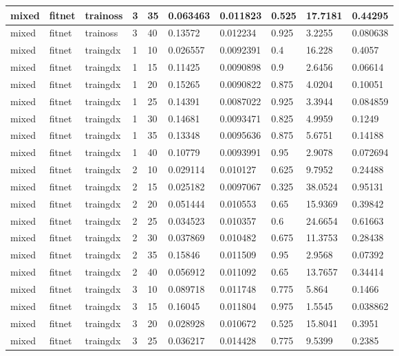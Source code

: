 \begin{longtable}{lllllllll}
mixed & fitnet & trainoss & 3 & 35 & 0.063463 & 0.011823 & 0.525 & 17.7181 & 0.44295 \\ \hline 
mixed & fitnet & trainoss & 3 & 40 & 0.13572 & 0.012234 & 0.925 & 3.2255 & 0.080638 \\ \hline 
mixed & fitnet & traingdx & 1 & 10 & 0.026557 & 0.0092391 & 0.4 & 16.228 & 0.4057 \\ \hline 
mixed & fitnet & traingdx & 1 & 15 & 0.11425 & 0.0090898 & 0.9 & 2.6456 & 0.06614 \\ \hline 
mixed & fitnet & traingdx & 1 & 20 & 0.15265 & 0.0090822 & 0.875 & 4.0204 & 0.10051 \\ \hline 
mixed & fitnet & traingdx & 1 & 25 & 0.14391 & 0.0087022 & 0.925 & 3.3944 & 0.084859 \\ \hline 
mixed & fitnet & traingdx & 1 & 30 & 0.14681 & 0.0093471 & 0.825 & 4.9959 & 0.1249 \\ \hline 
mixed & fitnet & traingdx & 1 & 35 & 0.13348 & 0.0095636 & 0.875 & 5.6751 & 0.14188 \\ \hline 
mixed & fitnet & traingdx & 1 & 40 & 0.10779 & 0.0093991 & 0.95 & 2.9078 & 0.072694 \\ \hline 
mixed & fitnet & traingdx & 2 & 10 & 0.029114 & 0.010127 & 0.625 & 9.7952 & 0.24488 \\ \hline 
mixed & fitnet & traingdx & 2 & 15 & 0.025182 & 0.0097067 & 0.325 & 38.0524 & 0.95131 \\ \hline 
mixed & fitnet & traingdx & 2 & 20 & 0.051444 & 0.010553 & 0.65 & 15.9369 & 0.39842 \\ \hline 
mixed & fitnet & traingdx & 2 & 25 & 0.034523 & 0.010357 & 0.6 & 24.6654 & 0.61663 \\ \hline 
mixed & fitnet & traingdx & 2 & 30 & 0.037869 & 0.010482 & 0.675 & 11.3753 & 0.28438 \\ \hline 
mixed & fitnet & traingdx & 2 & 35 & 0.15846 & 0.011509 & 0.95 & 2.9568 & 0.07392 \\ \hline 
mixed & fitnet & traingdx & 2 & 40 & 0.056912 & 0.011092 & 0.65 & 13.7657 & 0.34414 \\ \hline 
mixed & fitnet & traingdx & 3 & 10 & 0.089718 & 0.011748 & 0.775 & 5.864 & 0.1466 \\ \hline 
mixed & fitnet & traingdx & 3 & 15 & 0.16045 & 0.011804 & 0.975 & 1.5545 & 0.038862 \\ \hline 
mixed & fitnet & traingdx & 3 & 20 & 0.028928 & 0.010672 & 0.525 & 15.8041 & 0.3951 \\ \hline 
mixed & fitnet & traingdx & 3 & 25 & 0.036217 & 0.014428 & 0.775 & 9.5399 & 0.2385 \\ \hline 

\end{longtable}
